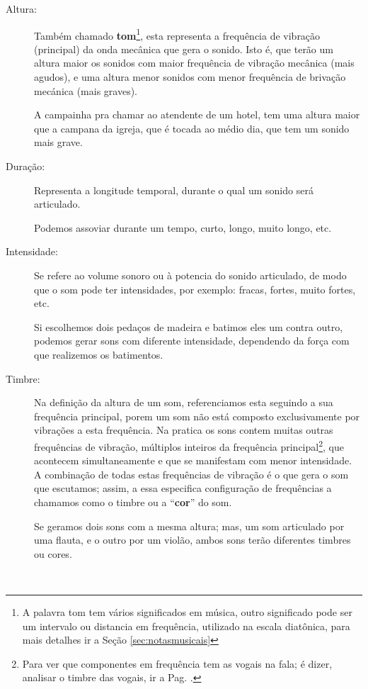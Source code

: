 \begin{description}
\item [Altura:] \label{sec:pos:Altura} 
Também chamado \textbf{tom}\footnote{A palavra tom tem vários significados em música, 
outro significado pode ser um intervalo ou distancia em frequência, 
utilizado na escala diatônica, para mais detalhes ir a Seção \ref{sec:notasmusicais}}, esta representa a frequência de vibração (principal) da onda mecânica que gera o sonido.
Isto é, que terão um altura maior os sonidos com maior frequência de vibração mecânica (mais agudos), 
e uma altura menor sonidos com menor frequência de brivação mecánica (mais graves).
\begin{example}
A campainha pra chamar ao atendente de um hotel, 
tem uma altura maior que a campana da igreja, 
que é tocada ao médio dia, que tem um sonido mais grave.
\end{example} 
\item [Duração:] \label{sec:pos:Duracion}
Representa a longitude temporal, durante o qual um sonido será articulado.
\begin{example}
Podemos assoviar durante um tempo, curto, longo, muito longo, etc.
\end{example} 
\item [Intensidade:] \label{sec:pos:Intensidade}
Se refere ao volume sonoro ou à potencia do sonido articulado, 
de modo que o som pode ter intensidades, por exemplo: fracas, fortes, muito fortes, etc.  
\begin{example}
Si escolhemos dois pedaços de madeira e batimos eles um contra outro, 
podemos gerar sons com diferente intensidade, dependendo da força com que realizemos os batimentos.
\end{example} 
\item [Timbre:] \label{sec:pos:timbre}
Na definição da altura de um som, referenciamos esta seguindo a sua frequência principal,
porem um som não está composto exclusivamente por vibrações a esta frequência.
Na pratica os sons contem muitas outras frequências de vibração, 
múltiplos inteiros da frequência principal\footnote{Para 
ver que componentes em frequência tem as vogais na fala;
é dizer, analisar o timbre das vogais, ir a Pag. \pageref{fig:timbresvocais}.}, 
que acontecem simultaneamente e 
que se manifestam com menor intensidade.
A combinação de todas estas frequências de vibração é o que gera o som que escutamos;
assim, a essa especifica configuração de frequências a chamamos como o timbre ou
a ``\textbf{cor}'' do som.
\begin{example}
Se geramos dois sons com a mesma altura; mas, um som articulado por uma flauta,
e o outro por um violão, ambos sons terão diferentes timbres ou cores.
\end{example} 
\end{description}
~\\



